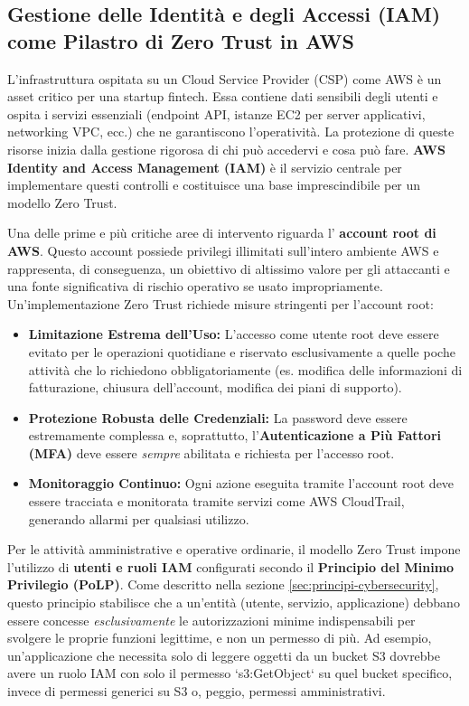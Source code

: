\subsection{Gestione delle Identità e degli Accessi (IAM) come Pilastro di Zero Trust in AWS}
\label{subsec:iam-zero-trust}

L'infrastruttura ospitata su un Cloud Service Provider (CSP) come AWS è un asset critico per una startup fintech. Essa contiene dati sensibili degli utenti e ospita i servizi essenziali (endpoint API, istanze EC2 per server applicativi, networking VPC, ecc.) che ne garantiscono l'operatività. La protezione di queste risorse inizia dalla gestione rigorosa di chi può accedervi e cosa può fare. \textbf{AWS Identity and Access Management (IAM)} è il servizio centrale per implementare questi controlli e costituisce una base imprescindibile per un modello Zero Trust.

Una delle prime e più critiche aree di intervento riguarda l' \textbf{account root di AWS}. Questo account possiede privilegi illimitati sull'intero ambiente AWS e rappresenta, di conseguenza, un obiettivo di altissimo valore per gli attaccanti e una fonte significativa di rischio operativo se usato impropriamente. Un'implementazione Zero Trust richiede misure stringenti per l'account root:
\begin{itemize}
    \item \textbf{Limitazione Estrema dell'Uso:} L'accesso come utente root deve essere evitato per le operazioni quotidiane e riservato esclusivamente a quelle poche attività che lo richiedono obbligatoriamente (es. modifica delle informazioni di fatturazione, chiusura dell'account, modifica dei piani di supporto).
    \item \textbf{Protezione Robusta delle Credenziali:} La password deve essere estremamente complessa e, soprattutto, l'\textbf{Autenticazione a Più Fattori (MFA)} deve essere \textit{sempre} abilitata e richiesta per l'accesso root.
    \item \textbf{Monitoraggio Continuo:} Ogni azione eseguita tramite l'account root deve essere tracciata e monitorata tramite servizi come AWS CloudTrail, generando allarmi per qualsiasi utilizzo.
\end{itemize}

Per le attività amministrative e operative ordinarie, il modello Zero Trust impone l'utilizzo di \textbf{utenti e ruoli IAM} configurati secondo il \textbf{Principio del Minimo Privilegio (PoLP)}. Come descritto nella sezione \ref{sec:principi-cybersecurity}, questo principio stabilisce che a un'entità (utente, servizio, applicazione) debbano essere concesse \textit{esclusivamente} le autorizzazioni minime indispensabili per svolgere le proprie funzioni legittime, e non un permesso di più. Ad esempio, un'applicazione che necessita solo di leggere oggetti da un bucket S3 dovrebbe avere un ruolo IAM con solo il permesso `s3:GetObject` su quel bucket specifico, invece di permessi generici su S3 o, peggio, permessi amministrativi.

